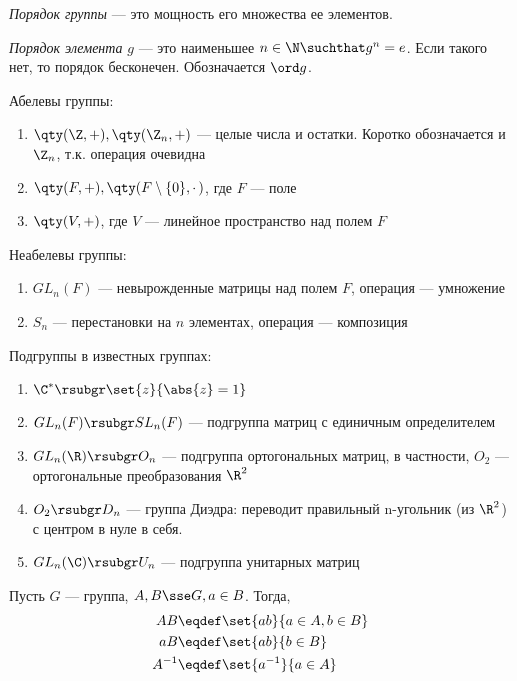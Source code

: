 \begin{definition}
  \emph{Порядок группы} --- это мощность его множества ее элементов.
\end{definition}

\begin{definition}
  \emph{Порядок элемента} $g$ --- это наименьшее $n \in \N \suchthat g^n=e$. Если такого нет, то порядок бесконечен. Обозначается $\ord g$.
\end{definition}

\begin{examples}
  Абелевы группы:
  \begin{enumerate}
    \item $\qty(\Z, +), \qty(\Z_n, +)$ --- целые числа и остатки. Коротко обозначается \Z и $\Z_n$, т.\:к. операция очевидна
    \item $\qty(F, +), \qty(F\setminus\{0\}, \cdotp)$, где $F$ --- поле
    \item $\qty(V, +)$, где $V$ --- линейное пространство над полем $F$
  \end{enumerate}

  Неабелевы группы:
  \begin{enumerate}[resume]
    \item $GL_n(F)$ --- невырожденные матрицы над полем $F$, операция --- умножение
    \item $S_n$ --- перестановки на $n$ элементах, операция --- композиция
  \end{enumerate}

  Подгруппы в известных группах:
  \begin{enumerate}[resume]
    \item $\C^\ast \rsubgr \set{z}{\abs{z}=1}$
    \item $GL_n(F) \rsubgr SL_n(F)$ --- подгруппа матриц с единичным определителем
    \item $GL_n(\R) \rsubgr O_n$ --- подгруппа ортогональных матриц, в частности, $O_2$ --- ортогональные преобразования $\R^2$
    \item $O_2 \rsubgr D_n$ --- группа Диэдра: переводит правильный n-угольник (из $\R^2$) с центром в нуле в себя.
    \item $GL_n(\C) \rsubgr U_n$ --- подгруппа унитарных матриц
  \end{enumerate}
\end{examples}


\begin{definition}
  Пусть $G$ --- группа, $A,B\sse G, a\in B$. Тогда,
  \begin{align*}
    AB     & \eqdef \set{ab}{a\in A, b \in B} \\
    aB     & \eqdef \set{ab}{b \in B}         \\
    A^{-1} & \eqdef \set{a^{-1}}{a \in A}
  \end{align*}
\end{definition}

